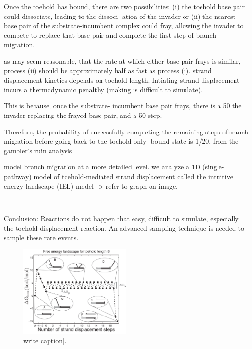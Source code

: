 Once the toehold has bound, there are two possibilities: (i) the toehold base pair could
dissociate, leading to the dissoci- ation of the invader or (ii) the nearest base pair of
the substrate-incumbent complex could fray, allowing the invader to compete to replace
that base pair and complete the first step of branch migration.

as may seem reasonable, that the rate at which either base pair frays is similar, process
(ii) should be approximately half as fast as process (i).  strand displacement kinetics
depends on toehold length.  Intiating strand displacement incurs a thermodynamic penalthy
(making is difficult to simulate).

This is because, once the substrate- incumbent base pair frays, there is a 50%
the invader replacing the frayed base pair, and a 50%
step.

Therefore, the probability of successfully completing the remaining steps ofbranch
migration before going back to the toehold-only- bound state is 1/20, from the gambler’s
ruin analysis

model branch migration at a more detailed level. we analyze a 1D (single-pathway) model
of toehold-mediated strand displacement called the intuitive energy landscape (IEL) model
-> refer to graph on image.

-----------------------------------------------------------------------------------------

Conclusion: Reactions do not happen that easy, difficult to simulate, especially the
toehold displacement reaction. An advanced sampling technique is needed to sample these
rare events.

\begin{figure}[ht]
\begin{center}
  \includegraphics[width=0.5\textwidth]{Figures/ToeholdDiagram.png}
  \caption{write caption[.]}
\end{center}
\end{figure}


